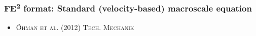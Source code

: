 \documentclass[11pt]{beamer} %
\renewcommand{\dev}{\mathrm{d}}
\newcommand{\roughcite}[1]{\textsc{#1}}
\begin{document}
\begin{frame}
 \frametitle{FE\textsuperscript{2} format: Standard (velocity-based) macroscale equation}

 \begin{center}
 
 \end{center}
 \begin{itemize}
   \item \roughcite{\"Ohman et al. (2012) Tech. Mechanik}
 \end{itemize}

\end{frame}
\end{document}
